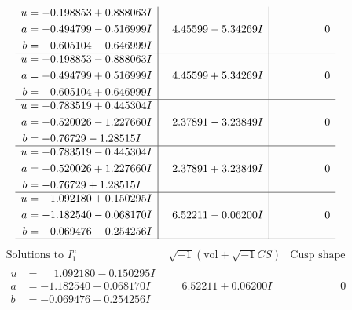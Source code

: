 \documentclass[1p]{elsarticle_modified}
\theoremstyle{definition}
\newcommand{\I}{\sqrt{-1}}
\begin{document}
$$\begin{array}{c|c|c}
\begin{aligned}
u &= -0.198853 + 0.888063 I \\
a &= -0.494799 - 0.516999 I \\
b &= \phantom{-}0.605104 - 0.646999 I\end{aligned}
 & \phantom{-}4.45599 - 5.34269 I & \phantom{-0.000000 } 0 \\ \hline\begin{aligned}
u &= -0.198853 - 0.888063 I \\
a &= -0.494799 + 0.516999 I \\
b &= \phantom{-}0.605104 + 0.646999 I\end{aligned}
 & \phantom{-}4.45599 + 5.34269 I & \phantom{-0.000000 } 0 \\ \hline\begin{aligned}
u &= -0.783519 + 0.445304 I \\
a &= -0.520026 - 1.227660 I \\
b &= -0.76729 - 1.28515 I\end{aligned}
 & \phantom{-}2.37891 - 3.23849 I & \phantom{-0.000000 } 0 \\ \hline\begin{aligned}
u &= -0.783519 - 0.445304 I \\
a &= -0.520026 + 1.227660 I \\
b &= -0.76729 + 1.28515 I\end{aligned}
 & \phantom{-}2.37891 + 3.23849 I & \phantom{-0.000000 } 0 \\ \hline\begin{aligned}
u &= \phantom{-}1.092180 + 0.150295 I \\
a &= -1.182540 - 0.068170 I \\
b &= -0.069476 - 0.254256 I\end{aligned}
 & \phantom{-}6.52211 - 0.06200 I & \phantom{-0.000000 } 0\\
 \hline 
 \end{array}$$\newpage$$\begin{array}{c|c|c}  
\text{Solutions to }I^u_{1}& \I (\text{vol} + \sqrt{-1}CS) & \text{Cusp shape}\\
 \hline 
\begin{aligned}
u &= \phantom{-}1.092180 - 0.150295 I \\
a &= -1.182540 + 0.068170 I \\
b &= -0.069476 + 0.254256 I\end{aligned}
 & \phantom{-}6.52211 + 0.06200 I & \phantom{-0.000000 } 0 \\ \hline\begin{aligned}

\end{aligned}
\end{array}$$
\end{document}
